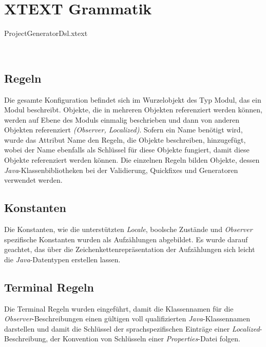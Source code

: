 \section{XTEXT Grammatik}
\begin{code}
	\caption{ProjectGeneratorDsl.xtext}
	\label{src:xtext-grammar}
\end{code}
\ \newline

\subsection{Regeln}
Die gesamte Konfiguration befindet sich im Wurzelobjekt des Typ Modul, das ein Modul beschreibt. Objekte, die in mehreren Objekten referenziert werden können, werden auf Ebene des Moduls einmalig beschrieben und dann von anderen Objekten referenziert \emph{(Observer, Localized)}. Sofern ein Name benötigt wird, wurde das Attribut Name den Regeln, die Objekte beschreiben, hinzugefügt, wobei der Name ebenfalls als Schlüssel für diese Objekte fungiert, damit diese Objekte referenziert werden können. Die einzelnen Regeln bilden Objekte, dessen \emph{Java}-Klassenbibliotheken bei der Validierung, Quickfixes und Generatoren verwendet werden.
 
\subsection{Konstanten}
Die Konstanten, wie die unterstützten \emph{Locale}, boolsche Zustände und \emph{Observer} spezifische Konstanten wurden als Aufzählungen abgebildet. Es wurde darauf geachtet, das über die Zeichenkettenrepräsentation der Aufzählungen sich leicht die \emph{Java}-Datentypen erstellen lassen.

\subsection{Terminal Regeln}
Die Terminal Regeln wurden eingeführt, damit die Klassennamen für die \emph{Observer}-Beschreibungen einen gültigen voll qualifizierten  \emph{Java}-Klassennamen darstellen und damit die Schlüssel der sprachspezifischen Einträge einer \emph{Localized}-Beschreibung, der Konvention von Schlüsseln einer \emph{Properties}-Datei folgen.
\newpage